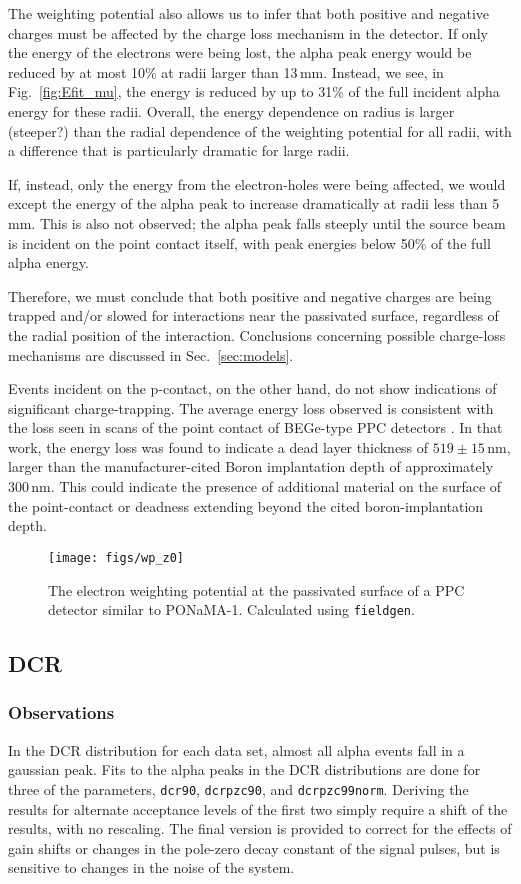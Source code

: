 \documentclass[groupedaddress,rmp,amsmath,amssymb,bibnotes,altaffilletter,twocolumn]{revtex4-1}
\begin{document}
The weighting potential also allows us to infer that both positive and negative charges must be affected by the charge loss mechanism in the detector. If only the energy of the electrons were being lost, the alpha peak energy would be reduced by at most 10\% at radii larger than 13\,mm. Instead, we see, in Fig.~\ref{fig:Efit_mu}, the energy is reduced by up to 31\% of the full incident alpha energy for these radii. Overall, the energy dependence on radius is larger (steeper?) than the radial dependence of the weighting potential for all radii, with a difference that is particularly dramatic for large radii. 

If, instead, only the energy from the electron-holes were being affected, we would except the energy of the alpha peak to increase dramatically at radii less than 5\,mm. This is also not observed; the alpha peak falls steeply until the source beam is incident on the point contact itself, with peak energies below 50\% of the full alpha energy. 

Therefore, we must conclude that both positive and negative charges are being trapped and/or slowed for interactions near the passivated surface, regardless of the radial position of the interaction. Conclusions concerning possible charge-loss mechanisms are discussed in Sec.~\ref{sec:models}.

Events incident on the p-contact, on the other hand, do not show indications of significant charge-trapping. The average energy loss observed is consistent with the loss seen in scans of the point contact of BEGe-type PPC detectors \cite{Agostini_thesis}. In that work, the energy loss was found to indicate a dead layer thickness of $519\pm15$\,nm, larger than the manufacturer-cited Boron implantation depth of approximately 300\,nm. This could indicate the presence of additional material on the surface of the point-contact or deadness extending beyond the cited boron-implantation depth. 

\begin{figure}[]
 \centering
 \texttt{[image: figs/wp\_z0]}
 \caption{The electron weighting potential at the passivated surface of a PPC detector similar to PONaMA-1. Calculated using {\tt fieldgen}.} 
 \label{fig:wp_z0}
\end{figure}

\subsection{DCR}
\subsubsection{Observations}
In the DCR distribution for each data set, almost all alpha events fall in a gaussian peak. Fits to the alpha peaks in the DCR distributions are done for three of the parameters, {\tt dcr90}, {\tt dcrpzc90}, and {\tt dcrpzc99norm}. Deriving the results for alternate acceptance levels of the first two simply require a shift of the results, with no rescaling. The final version is provided to correct for the effects of gain shifts or changes in the pole-zero decay constant of the signal pulses, but is sensitive to changes in the noise of the system. 
\end{document}

